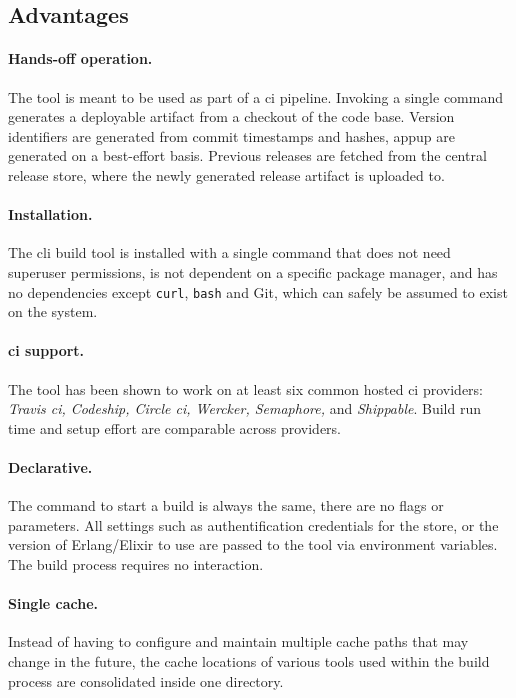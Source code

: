 \subsection{Advantages}

\paragraph{Hands-off operation.} The tool is meant to be used as part of a \acrfull{ci} pipeline. Invoking a single command generates a deployable artifact from a checkout of the code base. Version identifiers are generated from commit timestamps and hashes, \acrfull{appup} are generated on a best-effort basis. Previous releases are fetched from the central release store, where the newly generated release artifact is uploaded to.

\paragraph{Installation.} The \acrshort{cli} build tool is installed with a single command that does not need superuser permissions, is not dependent on a specific package manager, and has no dependencies except \lstinline|curl|, \lstinline|bash| and Git, which can safely be assumed to exist on the system.

\paragraph{\acrshort{ci} support.} The tool has been shown to work on at least six common hosted \acrfull{ci} providers: \emph{Travis \acrshort{ci}, Codeship, Circle \acrshort{ci}, Wercker, Semaphore,} and \emph{Shippable}. Build run time and setup effort are comparable across providers.

\paragraph{Declarative.} The command to start a build is always the same, there are no flags or parameters. All settings such as authentification credentials for the store, or the version of Erlang/Elixir to use are passed to the tool via environment variables. The build process requires no interaction.

\paragraph{Single cache.}  Instead of having to configure and maintain multiple cache paths that may change in the future, the cache locations of various tools used within the build process are consolidated inside one directory.

